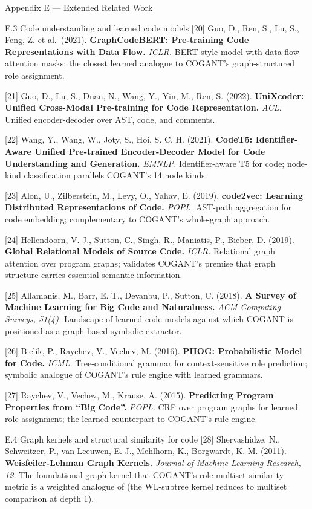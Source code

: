 \documentclass[
  ignorenonframetext,
]{beamer}
\begin{document}
\begin{frame}[fragile]{Appendix E --- Extended Related Work}
\begin{block}{E.3 Code understanding and learned code models}
{[}20{]} Guo, D., Ren, S., Lu, S., Feng, Z. et al.~(2021).
\textbf{GraphCodeBERT: Pre-training Code Representations with Data
Flow.} \emph{ICLR.} BERT-style model with data-flow attention masks; the
closest learned analogue to COGANT's graph-structured role assignment.

{[}21{]} Guo, D., Lu, S., Duan, N., Wang, Y., Yin, M., Ren, S. (2022).
\textbf{UniXcoder: Unified Cross-Modal Pre-training for Code
Representation.} \emph{ACL.} Unified encoder-decoder over AST, code, and
comments.

{[}22{]} Wang, Y., Wang, W., Joty, S., Hoi, S. C. H. (2021).
\textbf{CodeT5: Identifier-Aware Unified Pre-trained Encoder-Decoder
Model for Code Understanding and Generation.} \emph{EMNLP.}
Identifier-aware T5 for code; node-kind classification parallels
COGANT's 14 node kinds.

{[}23{]} Alon, U., Zilberstein, M., Levy, O., Yahav, E. (2019).
\textbf{code2vec: Learning Distributed Representations of Code.}
\emph{POPL.} AST-path aggregation for code embedding; complementary to
COGANT's whole-graph approach.

{[}24{]} Hellendoorn, V. J., Sutton, C., Singh, R., Maniatis, P.,
Bieber, D. (2019). \textbf{Global Relational Models of Source Code.}
\emph{ICLR.} Relational graph attention over program graphs; validates
COGANT's premise that graph structure carries essential semantic
information.

{[}25{]} Allamanis, M., Barr, E. T., Devanbu, P., Sutton, C. (2018).
\textbf{A Survey of Machine Learning for Big Code and Naturalness.}
\emph{ACM Computing Surveys, 51(4).} Landscape of learned code models
against which COGANT is positioned as a graph-based symbolic extractor.

{[}26{]} Bielik, P., Raychev, V., Vechev, M. (2016). \textbf{PHOG:
Probabilistic Model for Code.} \emph{ICML.} Tree-conditional grammar for
context-sensitive role prediction; symbolic analogue of COGANT's rule
engine with learned grammars.

{[}27{]} Raychev, V., Vechev, M., Krause, A. (2015). \textbf{Predicting
Program Properties from ``Big Code''.} \emph{POPL.} CRF over program
graphs for learned role assignment; the learned counterpart to COGANT's
rule engine.
\end{block}

\begin{block}{E.4 Graph kernels and structural similarity for code}
\protect{}\label{e.4-graph-kernels-and-structural-similarity-for-code}
{[}28{]} Shervashidze, N., Schweitzer, P., van Leeuwen, E. J., Mehlhorn,
K., Borgwardt, K. M. (2011). \textbf{Weisfeiler-Lehman Graph Kernels.}
\emph{Journal of Machine Learning Research, 12.} The foundational graph
kernel that COGANT's role-multiset similarity metric is a weighted
analogue of (the WL-subtree kernel reduces to multiset comparison at
depth 1).


\end{block}
\end{frame}
\end{document}
